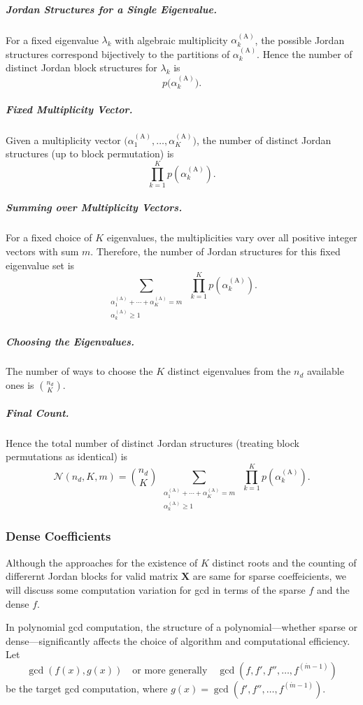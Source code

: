 \documentclass[11pt]{article}
\begin{document}
\subparagraph{Jordan Structures for a Single Eigenvalue.}
For a fixed eigenvalue \(\lambda_k\) with algebraic multiplicity \(\alpha_{k}^{(\mathrm{A})}\), the possible Jordan structures correspond bijectively to the partitions of \(\alpha_{k}^{(\mathrm{A})}\).  
Hence the number of distinct Jordan block structures for \(\lambda_k\) is
\[
p\big(\alpha_{k}^{(\mathrm{A})}\big).
\]

\subparagraph{Fixed Multiplicity Vector.}
Given a multiplicity vector \(\big(\alpha_{1}^{(\mathrm{A})},\dots,\alpha_{K}^{(\mathrm{A})}\big)\), the number of distinct Jordan structures (up to block permutation) is
\[
\prod_{k=1}^K p\!\left(\alpha_{k}^{(\mathrm{A})}\right).
\]

\subparagraph{Summing over Multiplicity Vectors.}
For a fixed choice of \(K\) eigenvalues, the multiplicities vary over all positive integer vectors with sum \(m\).  
Therefore, the number of Jordan structures for this fixed eigenvalue set is
\[
\sum_{\substack{\alpha_{1}^{(\mathrm{A})}+\cdots+\alpha_{K}^{(\mathrm{A})}=m \\ \alpha_{k}^{(\mathrm{A})}\geq 1}}
\;\prod_{k=1}^K p\!\left(\alpha_{k}^{(\mathrm{A})}\right).
\]

\subparagraph{Choosing the Eigenvalues.}
The number of ways to choose the \(K\) distinct eigenvalues from the \(n_d\) available ones is
\(\binom{n_d}{K}\).

\subparagraph{Final Count.}
Hence the total number of distinct Jordan structures (treating block permutations as identical) is
\begin{equation}\label{eq:Jordan-structure-count}
\boxed{\;
\mathcal{N}(n_d,K,m)
=
\binom{n_d}{K}\,
\sum_{\substack{\alpha_{1}^{(\mathrm{A})}+\cdots+\alpha_{K}^{(\mathrm{A})}=m \\ \alpha_{k}^{(\mathrm{A})}\geq 1}}
\;\prod_{k=1}^K p\!\left(\alpha_{k}^{(\mathrm{A})}\right).
\;}
\end{equation}


\subsubsection{Dense Coefficients}


Although the approaches for the existence of $K$ distinct roots and the counting of differernt Jordan blocks for valid matrix $\bm{X}$ are same for sparse coeffeicients, we will discuss some computation variation for gcd in terms of the sparse $f$ and the dense $f$. 

In polynomial gcd computation, the structure of a polynomial—whether sparse or dense—significantly affects the choice of algorithm and computational efficiency. Let
\[
\gcd(f(x), g(x)) \quad \text{or more generally} \quad \gcd(f, f', f'', \dots, f^{(\acute{m}-1)})
\]
be the target gcd computation, where $g(x)=\gcd(f', f'', \dots, f^{(\acute{m}-1)})$.
\end{document}
